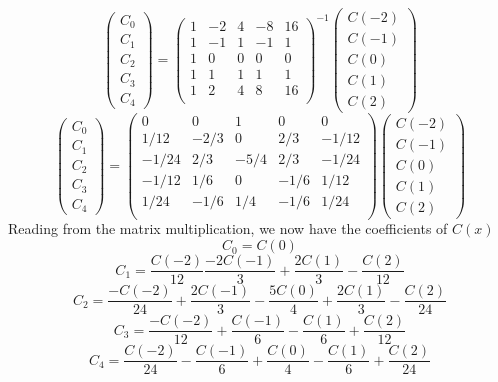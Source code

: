 \documentclass[11pt, a4paper]{article}
\begin{document}
{{{       \[ \begin{pmatrix}
          C_0 \\ C_1 \\ C_2 \\ C_3 \\ C_4
        \end{pmatrix} =
        \begin{pmatrix}
          1 & -2 & 4 & -8 & 16 \\
          1 & -1 & 1 & -1& 1 \\
          1 & 0 & 0 & 0 & 0 \\
          1 & 1 & 1 & 1& 1 \\
          1 & 2 & 4 & 8 & 16 \\
        \end{pmatrix}^{-1}
        \begin{pmatrix}
          C(-2) \\ C(-1) \\ C(0) \\ C(1) \\ C(2)
      \end{pmatrix} \]
       \[ \begin{pmatrix}
          C_0 \\ C_1 \\ C_2 \\ C_3 \\ C_4
        \end{pmatrix} =
        \begin{pmatrix}
          0 & 0 & 1 & 0 & 0 \\
          1/12 & -2/3 & 0 & 2/3 & -1/12 \\
          -1/24 & 2/3 & -5/4 & 2/3 & -1/24 \\
          -1/12 & 1/6 & 0 & -1/6 & 1/12 \\
          1/24 & -1/6 & 1/4 & -1/6 & 1/24 \\
        \end{pmatrix}
        \begin{pmatrix}
          C(-2) \\ C(-1) \\ C(0) \\ C(1) \\ C(2)
      \end{pmatrix} \]
Reading from the matrix multiplication, we now have the coefficients of $C(x)$
\[C_0 = C(0)\]
\[C_1 = \frac{C(-2)}{12} \frac{-2C(-1)}{ 3 } + \frac{ 2C(1)}{ 3 } - \frac {C(2)}{ 12 }\]
\[C_2 = \frac{-C(-2)}{ 24 } +\frac{ 2C(-1)}{ 3 } - \frac{5C(0)}{ 4 } + \frac{2C(1)}{ 3 } - \frac{C(2)}{24}\]
\[C_3 = \frac{-C(-2)}{ 12 } + \frac{C(-1)}{6} - \frac{C(1)}{6} + \frac{C(2)}{ 12 }\]
\[C_4 = \frac{C(-2)}{ 24 } - \frac{C(-1)}{ 6 } + \frac{C(0)}{ 4 } - \frac{C(1)}{ 6 } + \frac{C(2)}{ 24 }\]

}}}
\end{document}
